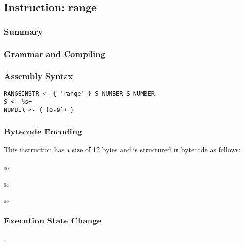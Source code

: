 \subsection{Instruction: range}

\subsubsection{Summary}


\subsubsection{Grammar and Compiling}


\subsubsection{Assembly Syntax}

\begin{myquote}
\begin{verbatim}
RANGEINSTR <- { 'range' } S NUMBER S NUMBER
S <- %s+
NUMBER <- { [0-9]+ }
\end{verbatim}
\end{myquote}

\subsubsection{Bytecode Encoding}

This instruction has a size of 12 bytes and is structured in bytecode as follows:

$_{00}$\ 



$_{04}$\ 



$_{08}$\ 
\fbox{%
  \parbox{20pt}{%
00
  }%
}


\subsubsection{Execution State Change}

.


